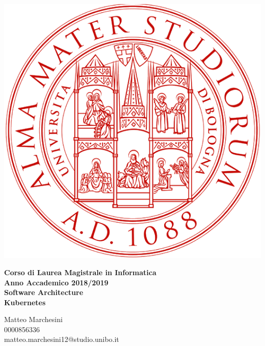 \documentclass[12pt, a4paper]{report}
\begin{document}
\begin{titlepage}
\vspace{15mm}
\begin{center}
  \includegraphics{Images/uniboLogo}
\end{center}
\begin{center}
{\normalsize{\bf Corso di Laurea Magistrale in Informatica}}\\
\vspace{5mm}
{\normalsize{\bf Anno Accademico 2018/2019}}\\
\vspace{20mm}
{\Large{\bf Software Architecture}}\\
\vspace{10mm}
{\Huge{\bf Kubernetes}}\\
\vspace{25mm}
\end{center}
\begin{flushright}
{\large{Matteo Marchesini\\0000856336\\matteo.marchesini12@studio.unibo.it}}
\end{flushright}
\end{titlepage}
\tableofcontents
\end{document}
